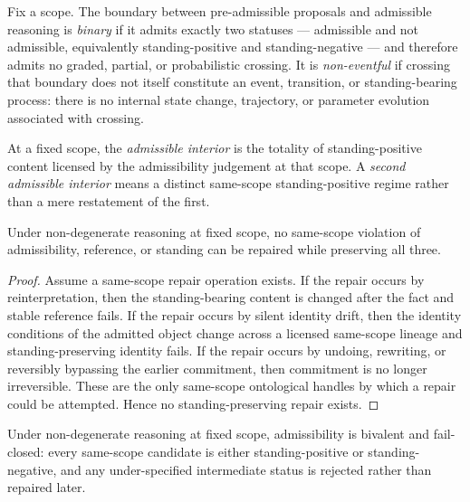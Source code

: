 \begin{definition}\label{def:binary-boundary}
Fix a scope. The boundary between pre-admissible proposals and admissible reasoning is \emph{binary} if it admits exactly two statuses --- admissible and not admissible, equivalently standing-positive and standing-negative --- and therefore admits no graded, partial, or probabilistic crossing. It is \emph{non-eventful} if crossing that boundary does not itself constitute an event, transition, or standing-bearing process: there is no internal state change, trajectory, or parameter evolution associated with crossing.
\end{definition}

\begin{definition}\label{def:admissible-interior}
At a fixed scope, the \emph{admissible interior} is the totality of standing-positive content licensed by the admissibility judgement at that scope. A \emph{second admissible interior} means a distinct same-scope standing-positive regime rather than a mere restatement of the first.
\end{definition}

\begin{lemma}\label{lem:no-standing-preserving-repair}
Under non-degenerate reasoning at fixed scope, no same-scope violation of admissibility, reference, or standing can be repaired while preserving all three.
\end{lemma}

\begin{proof}
Assume a same-scope repair operation exists. If the repair occurs by reinterpretation, then the standing-bearing content is changed after the fact and stable reference fails. If the repair occurs by silent identity drift, then the identity conditions of the admitted object change across a licensed same-scope lineage and standing-preserving identity fails. If the repair occurs by undoing, rewriting, or reversibly bypassing the earlier commitment, then commitment is no longer irreversible. These are the only same-scope ontological handles by which a repair could be attempted. Hence no standing-preserving repair exists.
\end{proof}

\begin{proposition}\label{prop:fixed-scope-bivalence}
Under non-degenerate reasoning at fixed scope, admissibility is bivalent and fail-closed: every same-scope candidate is either standing-positive or standing-negative, and any under-specified intermediate status is rejected rather than repaired later.
\end{proposition}

